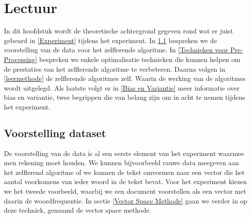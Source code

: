\chapter{Lectuur}\label{Lectuur}

In dit hoofdstuk wordt de theoretische achtergrond gegeven rond wat er juist gebeurd in \ref{Experiment} tijdens het experiment. In \ref{Voorstelling dataset} bespreken we de voorstelling van de data voor het zelflerende algoritme. In \ref{Technieken voor Pre-Processing} bespreken we enkele optimalisatie technieken die kunnen helpen om de prestaties van het zelflerende algoritme te verbeteren. Daarna volgen  in \ref{leermethode} de zelflerende algoritmes zelf. Waarin de werking van de algoritmes wordt uitgelegd. Als laatste volgt er in \ref{Bias en Variantie} meer informatie over bias en variantie, twee begrippen die van belang zijn om in acht te nemen tijdens het experiment.

\section{Voorstelling dataset}\label{Voorstelling dataset}
%
De voorstelling van de data is al een eerste element van  het experiment waarmee men rekening moet houden. We kunnen bijvoorbeeld rauwe data meegeven aan het zelflerend algoritme of we kunnen de tekst omvormen naar een vector die het aantal voorkomens van ieder woord in de tekst bevat. Voor het experiment kiezen we het tweede voorbeeld, waarbij we een document voorstellen als een vector met daarin de woordfrequentie.
In sectie \ref{Vector Space Methode} gaan we verder in op deze techniek, genaamd de vector space methode.

